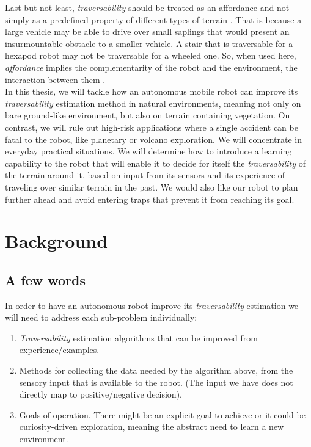 \documentclass[12pt,a4paper]{report}
\newcommand{\term}{\textit}
\begin{document}
	Last but not least, \term{traversability} should be treated as an affordance and 
	not simply as a predefined property of different types of terrain \cite{Kim}. 
	That is because a large vehicle may be able to drive over small saplings that 
	would present an insurmountable obstacle to a smaller vehicle. A stair that is 
	traversable for a hexapod robot may not be traversable for a wheeled one. So, 
	when used here, \term{affordance} implies the complementarity of the robot and 
	the environment, the interaction between them \cite{Ugur}.
	\\
	
	In this thesis, we will tackle how an autonomous mobile robot can improve its 
	\term{traversability} estimation method in natural environments, meaning not 
	only on bare ground-like environment, but also on terrain containing vegetation. 
	On contrast, we will rule out high-risk applications where a single accident can 
	be fatal to the robot, like planetary or volcano exploration. We will concentrate 
	in everyday practical situations. We will determine how to introduce a learning 
	capability to the robot that will enable it to decide for itself the 
	\term{traversability} of the terrain around it, based on input from its sensors 
	and its experience of traveling over similar terrain in the past. We would also 
	like our robot to plan further ahead and avoid entering traps that prevent it 
	from reaching its goal.
	\\
	
	\chapter{Background}
	\label{sec:bg}
	
	\section{A few words}
	\label{sec:bg:intro}
	
	In order to have an autonomous robot improve its \term{traversability} 
	estimation we will need to address each sub-problem individually:
	
	\begin{enumerate}
		\item \term{Traversability} estimation algorithms that can be improved from 
		experience/examples.
		\item Methods for collecting the data needed by the algorithm above, from 
		the sensory input that is available to the robot. (The input we have does not 
		directly map to positive/negative decision).
		\item Goals of operation. There might be an explicit goal to achieve or it 
		could be curiosity-driven exploration, meaning the abstract need to learn a 
		new environment.
	\end{enumerate}
	
\end{document}
